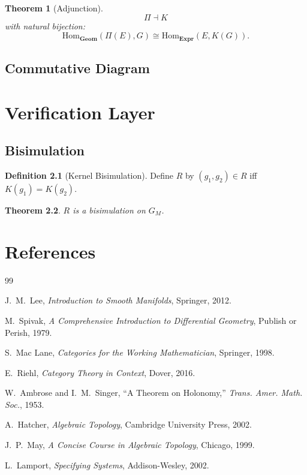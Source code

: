\documentclass[11pt,oneside]{memoir}
\theoremstyle{definition}
\newtheorem{definition}{Definition}[chapter]
\theoremstyle{plain}
\newtheorem{theorem}[definition]{Theorem}
\theoremstyle{remark}
\begin{document}
\begin{theorem}[Adjunction]
\[
\Pi \dashv K
\]
with natural bijection:
\[
\mathrm{Hom}_{\mathbf{Geom}}(\Pi(E), G) 
\cong 
\mathrm{Hom}_{\mathbf{Expr}}(E, K(G)).
\]
\end{theorem}

\section{Commutative Diagram}

\begin{center}
\end{center}

\chapter{Verification Layer}

\section{Bisimulation}

\begin{definition}[Kernel Bisimulation]
Define $R$ by $(g_1,g_2) \in R$ iff $K(g_1) = K(g_2)$.
\end{definition}

\begin{theorem}
$R$ is a bisimulation on $G_M$.
\end{theorem}

\chapter{References}

\begin{thebibliography}{99}

J.~M.~Lee, \emph{Introduction to Smooth Manifolds}, Springer, 2012.

M.~Spivak, \emph{A Comprehensive Introduction to Differential Geometry}, 
Publish or Perish, 1979.

S.~Mac Lane, \emph{Categories for the Working Mathematician}, Springer, 1998.

E.~Riehl, \emph{Category Theory in Context}, Dover, 2016.

W.~Ambrose and I.~M.~Singer, ``A Theorem on Holonomy,'' 
\emph{Trans. Amer. Math. Soc.}, 1953.

A.~Hatcher, \emph{Algebraic Topology}, Cambridge University Press, 2002.

J.~P.~May, \emph{A Concise Course in Algebraic Topology}, Chicago, 1999.

L.~Lamport, \emph{Specifying Systems}, Addison-Wesley, 2002.

\end{thebibliography}
\end{document}
